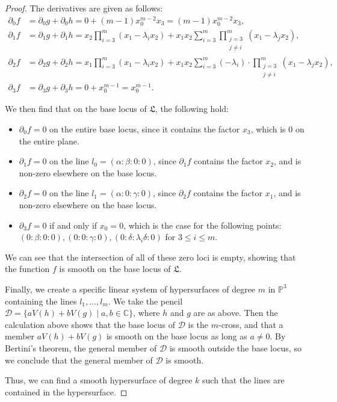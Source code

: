 \begin{proof}
    The derivatives are given as follows:
    \begin{align*}
        \partial_0 f &= \partial_0 g + \partial_0 h = 0 + (m-1)x_0^{m-2}x_3 = (m-1)x_0^{m-2}x_3, \\
        \partial_1 f &= \partial_1 g + \partial_1 h = x_2 \prod_{i=3}^m (x_1 - \lambda_i x_2) + x_1x_2 \sum_{i=3}^m \prod_{\substack{j=3 \\ j \neq i}}^m (x_1 - \lambda_j x_2), \\
        \partial_2 f &= \partial_2 g + \partial_2 h = x_1 \prod_{i=3}^m (x_1 - \lambda_i x_2) +  x_1x_2 \sum_{i=3}^m (-\lambda_i) \cdot \prod_{\substack{j=3 \\ j \neq i}}^m (x_1 - \lambda_j x_2), \\
        \partial_3 f &= \partial_3 g + \partial_3 h = 0 + x_0^{m-1} = x_0^{m-1}.
    \end{align*}

    We then find that on the base locus of $\mathfrak{L}$, the following hold:
    \begin{itemize}
        \item $\partial_0 f = 0$ on the entire base locus, since it contains the factor $x_3$, which is 0 on the entire plane.
        \item $\partial_1 f = 0$ on the line $l_0 = (\alpha : \beta : 0 : 0)$, since $\partial_1 f$ contains the factor $x_2$, and is non-zero elsewhere on the base locus.
        \item $\partial_2 f = 0$ on the line $l_1 = (\alpha : 0 : \gamma : 0)$, since $\partial_2 f$ contains the factor $x_1$, and is non-zero elsewhere on the base locus.
        \item $\partial_3 f = 0$ if and only if $x_0 = 0$, which is the case for the following points: $(0 : \beta : 0 : 0), (0 : 0 : \gamma : 0), (0 : \delta : \lambda_i \delta : 0)$ for $3 \leq i \leq m$.  
    \end{itemize}
    We can see that the intersection of all of these zero loci is empty, showing that the function $f$ is smooth on the base locus of $\mathfrak{L}$.

    Finally, we create a specific linear system of hypersurfaces of degree $m$ in $\mathbb{P}^3$ containing the lines $l_1, \dots, l_m$. We take the pencil $\mathcal{D} = \{aV(h) + bV(g) \mid a,b \in \mathbb{C}\}$, where $h$ and $g$ are as above. Then the calculation above shows that the base locus of $\mathcal{D}$ is the $m$-cross, and that a member $aV(h) + bV(g)$ is smooth on the base locus as long as $a \neq 0$. By Bertini's theorem, the general member of $\mathcal{D}$ is smooth outside the base locus, so we conclude that the general member of $\mathcal{D}$ is smooth.
    
    Thus, we can find a smooth hypersurface of degree $k$ such that the lines are contained in the hypersurface.
\end{proof}

